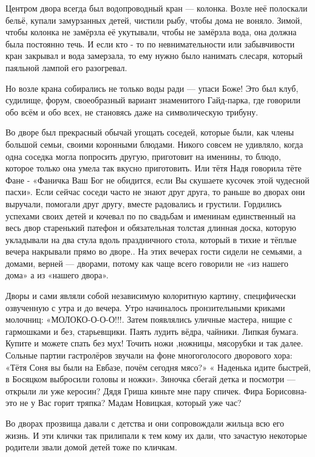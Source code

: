 Центром двора  всегда был водопроводный кран — колонка. Возле неё полоскали
бельё, купали замурзанных детей, чистили рыбу,  чтобы дома не воняло. Зимой,
чтобы колонка не замёрзла её укутывали, чтобы не замёрзла вода, она должна была
постоянно течь. И если кто - то по невнимательности или забывчивости кран
закрывал и вода замерзала, то ему нужно было нанимать слесаря, который паяльной
лампой его разогревал.

Но возле крана собирались не только  воды ради — упаси Боже! Это был клуб,
судилище, форум, своеобразный вариант знаменитого Гайд-парка, где говорили обо
всём и обо всех, не становясь даже на символическую трибуну.

Во дворе был прекрасный обычай угощать соседей, которые были, как члены
большой семьи, своими коронными блюдами. Никого совсем не удивляло, когда одна
соседка могла попросить другую, приготовит на именины, то блюдо, которое
только она умела так вкусно приготовить. Или тётя Надя говорила тёте Фане
-  «Фаничка Ваш Бог не обидится, если Вы скушаете кусочек этой чудесной пасхи».
Если сейчас соседи часто не знают друг друга, то раньше во дворах они выручали,
помогали друг другу, вместе радовались и грустили.  Гордились успехами  своих
детей и кочевал по по свадьбам и именинам единственный на весь двор старенький
патефон и обязательная толстая длинная доска, которую укладывали на два стула
вдоль праздничного стола, который в тихие и тёплые вечера накрывали прямо во
дворе.. На этих вечерах гости сидели не семьями, а домами, верней — дворами,
потому как чаще всего говорили не «из нашего дома» а из «нашего двора». 

Дворы и
сами являли собой независимую колоритную картину, специфически озвученную с
утра и до вечера. Утро начиналось пронзительными криками молочниц:
«МОЛОКО-О-О-О!!!. Затем появлялись уличные мастера, нищие с гармошками и без,
старьевщики. Паять лудить вёдра, чайники. Липкая бумага. Купите и можете спать
без мух! Точить ножи ,ножницы, мясорубки и так далее. Сольные партии
гастролёров звучали на фоне многоголосого дворового хора: «Тётя Соня вы были
на Евбазе, почём сегодня мясо?» « Наденька  идите быстрей, в Босяцком выбросили
головы и ножки». Зиночка сбегай детка и посмотри — открыли ли уже керосин?
Дядя Гриша киньте мне пару спичек. Фира Борисовна- это не у Вас горит тряпка?
Мадам Новицкая, который уже час? 

Во дворах прозвища давали  с детства и они
сопровождали жильца всю его жизнь. И эти клички так прилипали к тем кому их
дали, что зачастую  некоторые родители   звали  домой детей тоже по кличкам.

